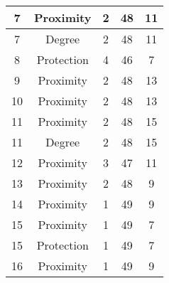 \documentclass[results.tex]{subfiles}
\begin{document}
\begin{center}
\begin{tabular}{| c || c | c | c | c |}
            \hline
            7                       & Proximity                    & 2                      & 48                      & 11                   \\
            \hline
            7                       & Degree                       & 2                      & 48                      & 11                   \\
            \hline
            8                       & Protection                   & 4                      & 46                      & 7                    \\
            \hline
            9                       & Proximity                    & 2                      & 48                      & 13                   \\
            \hline
            10                      & Proximity                    & 2                      & 48                      & 13                   \\
            \hline
            11                      & Proximity                    & 2                      & 48                      & 15                   \\
            \hline
            11                      & Degree                       & 2                      & 48                      & 15                   \\
            \hline
            12                      & Proximity                    & 3                      & 47                      & 11                   \\
            \hline
            13                      & Proximity                    & 2                      & 48                      & 9                    \\
            \hline
            14                      & Proximity                    & 1                      & 49                      & 9                    \\
            \hline
            15                      & Proximity                    & 1                      & 49                      & 7                    \\
            \hline
            15                      & Protection                   & 1                      & 49                      & 7                    \\
            \hline
            16                      & Proximity                    & 1                      & 49                      & 9                    \\

\end{tabular}
\end{center}
\end{document}
